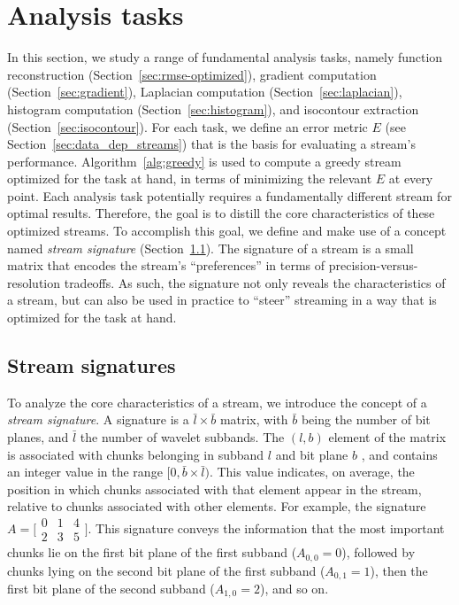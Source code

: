 \section{Analysis tasks}
\label{sec:analysis-tasks}

In this section, we study a range of fundamental analysis tasks, namely function reconstruction
(Section~\ref{sec:rmse-optimized}), gradient computation (Section~\ref{sec:gradient}), Laplacian
computation (Section~\ref{sec:laplacian}), histogram computation (Section~\ref{sec:histogram}), and
isocontour extraction (Section~\ref{sec:isocontour}). For each task, we define an error metric $E$
(see Section~\ref{sec:data_dep_streams}) that is the basis for evaluating a stream's performance.
Algorithm~\ref{alg:greedy} is used to compute a greedy stream optimized for the task at hand, in
terms of minimizing the relevant $E$ at every point. Each analysis task potentially requires a
fundamentally different stream for optimal results. Therefore, the goal is to distill the core
characteristics of these optimized streams. To accomplish this goal, we define and make use of a
concept named \emph{stream signature} (Section~\ref{sec:stream-signature}). The signature of a
stream is a small matrix that encodes the stream's ``preferences'' in terms of
precision-versus-resolution tradeoffs. As such, the signature not only reveals the characteristics
of a stream, but can also be used in practice to ``steer'' streaming in a way that is optimized for
the task at hand.

\subsection{Stream signatures}
\label{sec:stream-signature}

To analyze the core characteristics of a stream, we introduce the concept of a \emph{stream
signature}. A signature is a $\bar{l} \times \bar{b}$ matrix, with $\bar{b}$ being the number of bit
planes, and $\bar{l}$ the number of wavelet subbands. The $(l,b)$ element of the matrix is
associated with chunks belonging in subband $l$ and bit plane $b$ , and contains an integer value in
the range $[0,\bar{b}\times \bar{l})$. This value indicates, on average, the position in which
chunks associated with that element appear in the stream, relative to chunks associated with other
elements. For example, the signature  $A=\bigl[
\begin{smallmatrix}0 & 1 & 4\\ 2 & 3 & 5\end{smallmatrix}\bigr]$. This signature conveys the
information that the most important chunks lie on the first bit plane of the first subband
($A_{0,0}=0$), followed by chunks lying on the second bit plane of the first subband ($A_{0,1}=1$),
then the first bit plane of the second subband ($A_{1,0}=2$), and so on.

